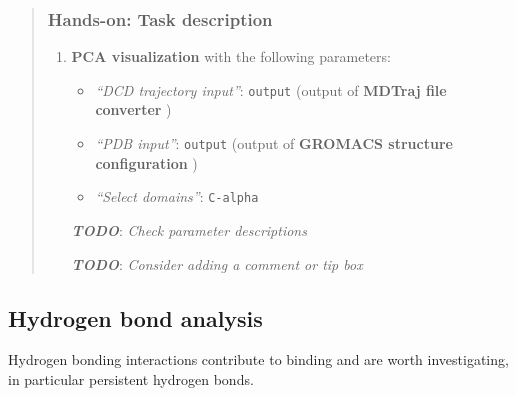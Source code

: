 \documentclass[twocolumn]{bmcart}%
\providecommand{\tightlist}{%
  \setlength{\itemsep}{0pt}\setlength{\parskip}{0pt}}
\providecommand{\tightlist}{%
  \setlength{\itemsep}{0pt}\setlength{\parskip}{0pt}}
\begin{document}
\begin{quote}
\hypertarget{hands-on-task-description-15}{%
\subsubsection{Hands-on: Task
description}\label{hands-on-task-description-15}}

\begin{enumerate}
\def\labelenumi{\arabic{enumi}.}
\tightlist
\item
  \textbf{PCA visualization} with the following parameters:

  \begin{itemize}
  \tightlist
  \item
    \emph{``DCD trajectory input''}: \texttt{output} (output of
    \textbf{MDTraj file converter} )
  \item
    \emph{``PDB input''}: \texttt{output} (output of \textbf{GROMACS
    structure configuration} )
  \item
    \emph{``Select domains''}: \texttt{C-alpha}
  \end{itemize}

  \textbf{\emph{TODO}}: \emph{Check parameter descriptions}

  \textbf{\emph{TODO}}: \emph{Consider adding a comment or tip box}
\end{enumerate}


\end{quote}


\hypertarget{hydrogen-bond-analysis}{%
\subsection{Hydrogen bond analysis}\label{hydrogen-bond-analysis}}

Hydrogen bonding interactions contribute to binding and are worth
investigating, in particular persistent hydrogen bonds.
\end{document}

